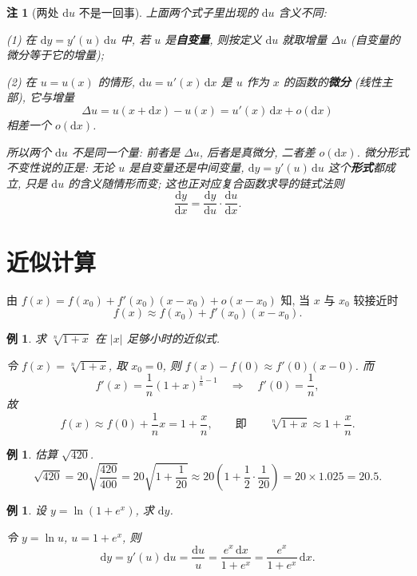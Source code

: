 \documentclass[UTF8,11pt]{ctexart}
\theoremstyle{cnthm}
\newtheorem{rem}[thm]{注}
\newtheorem{exa}[thm]{例}
\begin{document}
\begin{rem}[两处 $\mathrm{d}u$ 不是一回事]
上面两个式子里出现的 $\mathrm{d}u$ 含义不同:

(1) 在 $\mathrm{d}y=y'(u)\,\mathrm{d}u$ 中, 若 $u$ 是\textbf{自变量}, 则按定义 $\mathrm{d}u$ 就取增量 $\Delta u$ (自变量的微分等于它的增量);

(2) 在 $u=u(x)$ 的情形, $\mathrm{d}u=u'(x)\,\mathrm{d}x$ 是 $u$ 作为 $x$ 的函数的\textbf{微分} (线性主部), 它与增量
\[
\Delta u=u(x+\mathrm{d}x)-u(x)=u'(x)\,\mathrm{d}x+o(\mathrm{d}x)
\]
相差一个 $o(\mathrm{d}x)$.

所以两个 $\mathrm{d}u$ 不是同一个量: 前者是 $\Delta u$, 后者是真微分, 二者差 $o(\mathrm{d}x)$. 微分形式不变性说的正是: 无论 $u$ 是自变量还是中间变量, $\mathrm{d}y=y'(u)\,\mathrm{d}u$ 这个\textbf{形式}都成立, 只是 $\mathrm{d}u$ 的含义随情形而变; 这也正对应复合函数求导的链式法则
\[
\frac{\mathrm{d}y}{\mathrm{d}x}=\frac{\mathrm{d}y}{\mathrm{d}u}\cdot\frac{\mathrm{d}u}{\mathrm{d}x} .
\]
\end{rem}

\section{近似计算}

由 $f(x)=f(x_0)+f'(x_0)(x-x_0)+o(x-x_0)$ 知, 当 $x$ 与 $x_0$ 较接近时
\[
f(x)\approx f(x_0)+f'(x_0)(x-x_0).
\]

\begin{exa}
求 $\sqrt[n]{1+x}$ 在 $|x|$ 足够小时的近似式.

令 $f(x)=\sqrt[n]{1+x}$, 取 $x_0=0$, 则 $f(x)-f(0)\approx f'(0)(x-0)$. 而
\[
f'(x)=\frac1n(1+x)^{\frac1n-1}\quad\Longrightarrow\quad f'(0)=\frac1n ,
\]
故
\[
f(x)\approx f(0)+\frac1n x=1+\frac{x}{n},
\qquad\text{即}\qquad
\sqrt[n]{1+x}\approx 1+\frac{x}{n}.
\]
\end{exa}

\begin{exa}
估算 $\sqrt{420}$.
\[
\sqrt{420}=20\sqrt{\frac{420}{400}}=20\sqrt{1+\frac1{20}}
\approx 20\left(1+\frac1{2}\cdot\frac1{20}\right)=20\times1.025=20.5 .
\]
\end{exa}

\begin{exa}
设 $y=\ln(1+e^{x})$, 求 $\mathrm{d}y$.

令 $y=\ln u$, $u=1+e^{x}$, 则
\[
\mathrm{d}y=y'(u)\,\mathrm{d}u=\frac{\mathrm{d}u}{u}
=\frac{e^{x}\,\mathrm{d}x}{1+e^{x}}
=\frac{e^{x}}{1+e^{x}}\,\mathrm{d}x .
\]
\end{exa}
\end{document}

